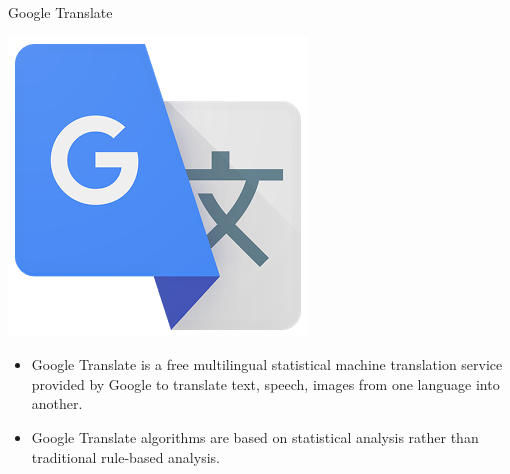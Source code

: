 \documentclass[xcolor=dvipsnames]{beamer}
\begin{document}
\begin{frame}
\begin{columns}[c]
\begin{exampleblock}{\small{Google Translate}}
\begin{center}
\includegraphics[scale=0.08]{images/google.png}
\end{center}
\small{
\begin{itemize}
\item Google Translate is a free multilingual statistical machine translation service provided by Google to translate text, speech, images from one language into another.
\item Google Translate algorithms are based on statistical analysis rather than traditional rule-based analysis.
\end{itemize}}
\end{exampleblock}
\end{columns}
\end{frame}
\end{document}
